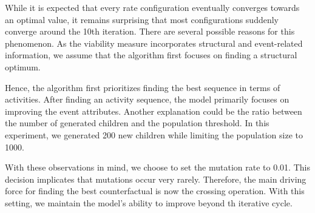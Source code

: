 \documentclass[./../../paper.tex]{subfiles}
\begin{document}
While it is expected that every rate configuration eventually converges towards an optimal value, it remains surprising that most configurations suddenly converge around the 10th iteration. 
There are several possible reasons for this phenomenon. As the viability measure incorporates structural and event-related information, we assume that the algorithm first focuses on finding a structural optimum. 

Hence, the algorithm first prioritizes finding the best sequence in terms of activities. After finding an activity sequence, the model primarily focuses on improving the event attributes. 
Another explanation could be the ratio between the number of generated children and the population threshold. In this experiment, we generated 200 new children while limiting the population size to 1000.  


With these observations in mind, we choose to set the mutation rate to 0.01.   This decision implicates that mutations occur very rarely. Therefore, the main driving force for finding the best counterfactual is now the crossing operation. With this setting, we maintain the model's ability to improve beyond th iterative cycle.
\end{document}
